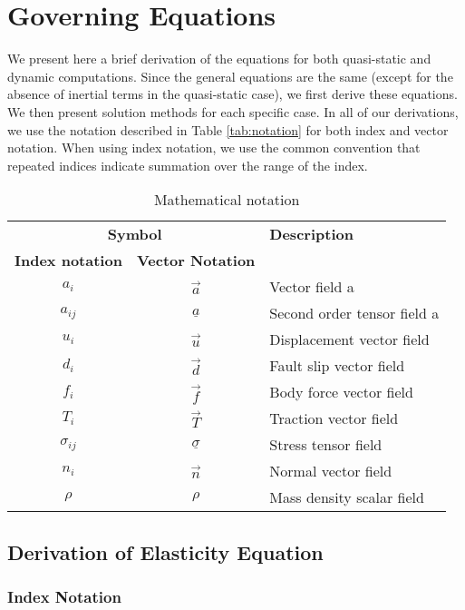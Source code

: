 \chapter{Governing Equations}
\label{cha:governing:equations}

We present here a brief derivation of the equations for both quasi-static
and dynamic computations. Since the general equations are the same
(except for the absence of inertial terms in the quasi-static case),
we first derive these equations. We then present solution methods
for each specific case. In all of our derivations, we use the notation
described in Table \vref{tab:notation} for both index
and vector notation. When using index notation, we use the common
convention that repeated indices indicate summation over the range
of the index.

\begin{table}[htbp]
  \caption{Mathematical notation}
  \label{tab:notation}
  \begin{tabular}{ccp{3in}}
    \multicolumn{2}{c}{{\bf Symbol}} & {\bf Description} \\
    {\bf Index notation} & {\bf Vector Notation} & \\
    \hline 
    $a_{i}$ & \raisebox{12pt}{}$\overrightarrow{a}$ & Vector field a \\
    $a_{ij}$ & $\underline{a}$ & Second order tensor field a \\
    $u_{i}$ & $\overrightarrow{u}$ & Displacement vector field \\
    $d_{i}$ & $\vec{{d}}$ & Fault slip vector field \\
    $f_{i}$ & $\overrightarrow{f}$ & Body force vector field \\
    $T_{i}$ & $\overrightarrow{T}$ & Traction vector field \\
    $\sigma_{ij}$ & $\underline{\sigma}$ & Stress tensor field \\
    $n_{i}$ & $\overrightarrow{n}$ & Normal vector field \\
    $\rho$ & $\rho$ & Mass density scalar field \\
    \hline 
  \end{tabular}
\end{table}


\section{Derivation of Elasticity Equation}

\subsection{Index Notation}

